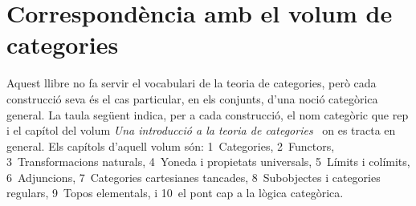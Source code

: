 \chapter[Correspondència amb les categories]{Correspondència amb el volum de categories}\label{cap:correspondencia}

Aquest llibre no fa servir el vocabulari de la teoria de categories, però
cada construcció seva és el cas particular, en els conjunts, d'una noció
categòrica general. La taula següent indica, per a cada construcció, el nom
categòric que rep i el capítol del volum \emph{Una introducció a la teoria de
categories}~\cite{perello-categories} on es tracta en general. Els capítols
d'aquell volum són: 1~Categories, 2~Functors, 3~Transformacions naturals,
4~Yoneda i propietats universals, 5~Límits i colímits, 6~Adjuncions,
7~Categories cartesianes tancades, 8~Subobjectes i categories regulars,
9~Topos elementals, i 10~el pont cap a la lògica categòrica.

